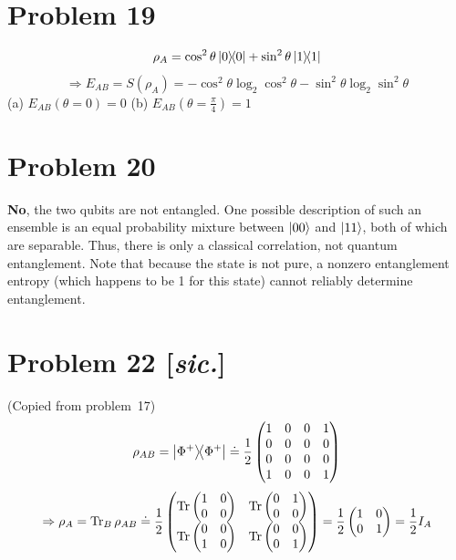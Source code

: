 \documentclass[11pt]{article}
\begin{document}
\section*{Problem 19}
\[
    \rho_A = \cos^2\theta \ketbra{0}{0} + \sin^2\theta\ketbra{1}{1}
\]
\[
    \Rightarrow E_{AB} = S(\rho_A)
    = -\cos^2\theta\log_2\cos^2\theta - \sin^2\theta\log_2\sin^2\theta
\]
(a) $E_{AB}(\theta=0) = 0$ \quad
(b) $E_{AB}(\theta=\frac{\pi}{4}) = 1$

\section*{Problem 20}
\textbf{No}, the two qubits are not entangled.
One possible description of such an ensemble is an equal probability mixture
between $\ket{00}$ and $\ket{11}$, both of which are separable.
Thus, there is only a classical correlation, not quantum entanglement.
Note that because the state is not pure, a nonzero entanglement entropy
(which happens to be 1 for this state) cannot reliably determine entanglement.

\section*{Problem 22 [\emph{sic.}]}
(Copied from problem~17)
\[
    \rho_{AB} = \ketbra{\Phi^+}{\Phi^+}
    \doteq \frac{1}{2} \begin{pmatrix}
        1 & 0 & 0 & 1 \\ 0 & 0 & 0 & 0 \\ 0 & 0 & 0 & 0 \\ 1 & 0 & 0 & 1
    \end{pmatrix}
\]
\[
    \Rightarrow \rho_A = \operatorname{Tr}_B \rho_{AB}
    \doteq \frac{1}{2} \begin{pmatrix}
        \operatorname{Tr}\begin{pmatrix} 1 & 0 \\ 0 & 0 \end{pmatrix} &
        \operatorname{Tr}\begin{pmatrix} 0 & 1 \\ 0 & 0 \end{pmatrix} \\
        \operatorname{Tr}\begin{pmatrix} 0 & 0 \\ 1 & 0 \end{pmatrix} &
        \operatorname{Tr}\begin{pmatrix} 0 & 0 \\ 0 & 1 \end{pmatrix}
    \end{pmatrix}
    = \frac{1}{2} \begin{pmatrix} 1 & 0 \\ 0 & 1 \end{pmatrix}
    = \frac{1}{2} I_A
\]
\end{document}
